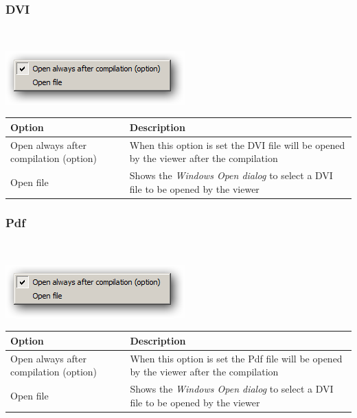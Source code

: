 \hypertarget{menu_tools_processing_viewer_DVI}{}
\subsubsection{DVI}\\

\includegraphics[scale=0.50]{./res/menu_tools_processing_viewer_dvi.png}\\

\begin{scriptsize}\begin{tabularx}{\textwidth}{>{\hsize=0.7\hsize}X>{\hsize=0.7\hsize}X}\\
    \hline
    \textbf{Option} & \textbf{Description} \\
    \hline
    Open always after compilation (option) & When this option is set the DVI file will be opened by the viewer after the compilation \\
    Open file & Shows the \textit{Windows Open dialog} to select a DVI file to be opened by the viewer \\
    \hline
  \end{tabularx}\end{scriptsize}


\hypertarget{menu_tools_processing_viewer_pdf}{}
\subsubsection{Pdf}\\

\includegraphics[scale=0.50]{./res/menu_tools_processing_viewer_pdf.png}\\

\begin{scriptsize}\begin{tabularx}{\textwidth}{>{\hsize=0.7\hsize}X>{\hsize=0.7\hsize}X}\\
    \hline
    \textbf{Option} & \textbf{Description} \\
    \hline
    Open always after compilation (option) & When this option is set the Pdf file will be opened by the viewer after the compilation \\
    Open file & Shows the \textit{Windows Open dialog} to select a DVI file to be opened by the viewer \\
    \hline
  \end{tabularx}\end{scriptsize}


